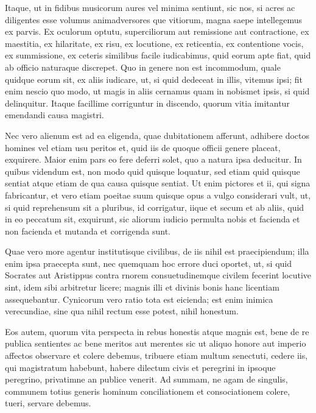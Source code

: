  Itaque, ut in fidibus musicorum aures vel minima sentiunt, sic nos, si acres ac diligentes esse volumus animadversores que vitiorum, magna saepe intellegemus ex parvis. Ex oculorum optutu, superciliorum aut remissione aut contractione, ex maestitia, ex hilaritate, ex risu, ex locutione, ex reticentia, ex contentione vocis, ex summissione, ex ceteris similibus facile iudicabimus, quid eorum apte fiat, quid ab officio naturaque discrepet. Quo in genere non est incommodum, quale quidque eorum sit, ex aliis iudicare, ut, si quid dedeceat in illis, vitemus ipsi; fit enim nescio quo modo, ut magis in aliis cernamus quam in nobismet ipsis, si quid delinquitur. Itaque facillime corriguntur in discendo, quorum vitia imitantur emendandi causa magistri.

 Nec vero alienum est ad ea eligenda, quae dubitationem afferunt, adhibere doctos homines vel etiam usu peritos et, quid iis de quoque officii genere placeat, exquirere. Maior enim pars eo fere deferri solet, quo a natura ipsa deducitur. In quibus videndum est, non modo quid quisque loquatur, sed etiam quid quisque sentiat atque etiam de qua causa quisque sentiat. Ut enim pictores et ii, qui signa fabricantur, et vero etiam poeitae suum quisque opus a vulgo considerari vult, ut, si quid reprehensum sit a pluribus, id corrigatur, iique et secum et ab aliis, quid in eo peccatum sit, exquirunt, sic aliorum iudicio permulta nobis et facienda et non facienda et mutanda et corrigenda sunt.

 Quae vero more agentur institutisque civilibus, de iis nihil est praecipiendum; illa enim ipsa praecepta sunt, nec quemquam hoc errore duci oportet, ut, si quid Socrates aut Aristippus contra rnorem consuetudinemque civilem fecerint locutive sint, idem sibi arbitretur licere; magnis illi et divinis bonis hanc licentiam assequebantur. Cynicorum vero ratio tota est eicienda; est enim inimica verecundiae, sine qua nihil rectum esse potest, nihil honestum.

 Eos autem, quorum vita perspecta in rebus honestis atque magnis est, bene de re publica sentientes ac bene meritos aut merentes sic ut aliquo honore aut imperio affectos observare et colere debemus, tribuere etiam multum senectuti, cedere iis, qui magistratum habebunt, habere dilectum civis et peregrini in ipsoque peregrino, privatimne an publice venerit. Ad summam, ne agam de singulis, communem totius generis hominum conciliationem et consociationem colere, tueri, servare debemus.

